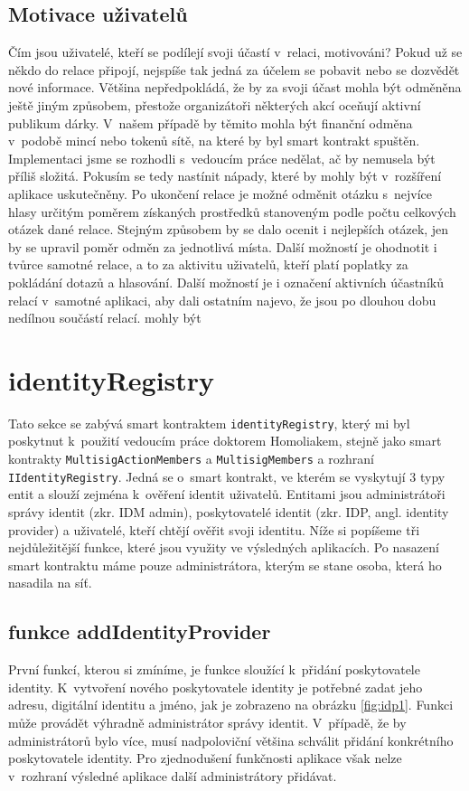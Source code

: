 \subsection*{Motivace uživatelů}
Čím jsou uživatelé, kteří se podílejí svoji účastí v~relaci, motivováni? Pokud už se někdo do relace připojí, nejspíše tak jedná za účelem se pobavit nebo se dozvědět nové informace. Většina nepředpokládá, že by za svoji účast mohla být odměněna ještě jiným způsobem, přestože organizátoři některých akcí oceňují aktivní publikum dárky. V~našem případě by těmito  mohla být finanční odměna v~podobě mincí nebo tokenů sítě, na které by byl smart kontrakt spuštěn. Implementaci jsme se rozhodli s~vedoucím práce nedělat, ač by nemusela být příliš složitá. Pokusím se tedy nastínit nápady, které by mohly být v~rozšíření aplikace uskutečněny. Po ukončení relace je možné odměnit otázku s~nejvíce hlasy určitým poměrem získaných prostředků stanoveným podle počtu celkových otázek dané relace. Stejným způsobem by se dalo ocenit i nejlepších  otázek, jen by se upravil poměr odměn za jednotlivá místa. Další možností je ohodnotit i tvůrce samotné relace, a to za aktivitu uživatelů, kteří platí poplatky za pokládání dotazů a hlasování. Další možností je i označení aktivních účastníků relací v~samotné aplikaci, aby dali ostatním najevo, že jsou po dlouhou dobu nedílnou součástí relací.  
mohly být
\section{identityRegistry}
\label{identityRegistry}
Tato sekce se zabývá smart kontraktem \texttt{identityRegistry}, který mi byl poskytnut k~použití vedoucím práce doktorem Homoliakem, stejně jako smart kontrakty \texttt{MultisigAction\-Members} a \texttt{MultisigMembers} a rozhraní \texttt{IIdentityRegistry}. Jedná se o~smart kontrakt, ve kterém se vyskytují 3 typy entit a slouží zejména k~ověření identit uživatelů. Entitami jsou administrátoři správy identit (zkr. IDM admin), poskytovatelé identit (zkr. IDP, angl. identity provider) a uživatelé, kteří chtějí ověřit svoji identitu. Níže si popíšeme tři nejdůležitější funkce, které jsou využity ve výsledných aplikacích. Po nasazení smart kontraktu máme pouze administrátora, kterým se stane osoba, která ho nasadila na síť. 
\subsection{funkce addIdentityProvider}
První funkcí, kterou si zmíníme, je funkce sloužící k~přidání poskytovatele identity. K~vytvoření nového poskytovatele identity je potřebné zadat jeho adresu, digitální identitu a jméno, jak je zobrazeno na obrázku \ref{fig:idp1}. Funkci může provádět výhradně administrátor správy identit. V~případě, že by administrátorů bylo více, musí nadpoloviční většina schválit přidání konkrétního poskytovatele identity. Pro zjednodušení funkčnosti aplikace však nelze v~rozhraní výsledné aplikace další administrátory přidávat. 


